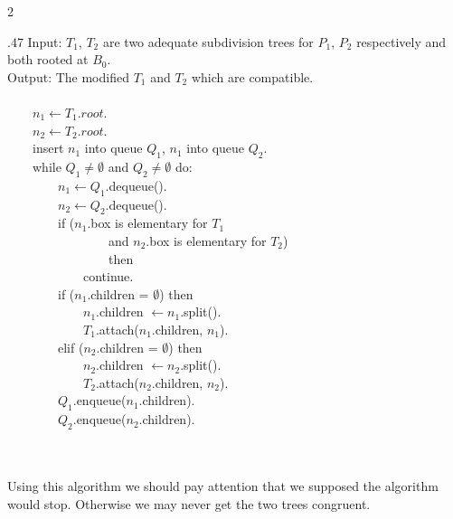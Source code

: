 \documentclass[twoside]{article}
\begin{document}
\begin{multicols}{2}
\begin{boxedminipage}{.47\textwidth}
Input: $T_1$, $T_2$ are two adequate subdivision trees for $P_1$, $P_2$ respectively and both rooted at $B_0$.
\\
Output: The modified $T_1$ and $T_2$ which are compatible.
\\
\\ \indent \ \ \ \ 
$n_1 \leftarrow T_1.root$.
\\ \indent \ \ \ \ 
$n_2 \leftarrow T_2.root$.
\\ \indent \ \ \ \ 
insert $n_1$ into queue $Q_1$, $n_1$ into queue $Q_2$.
\\ \indent \ \ \ \ 
while $Q_1 \neq \emptyset$ and $Q_2 \neq \emptyset$ do:
\\ \indent \ \ \ \ \ \ \ \ 
$n_1 \leftarrow Q_1$.dequeue().
\\ \indent \ \ \ \ \ \ \ \ 
$n_2 \leftarrow Q_2$.dequeue().
\\ \indent \ \ \ \ \ \ \ \ 
if ($n_1$.box is elementary for $T_1$
\\ \indent \ \ \ \ \ \ \ \ \ \ \ \ \ \ \ \ 
and $n_2$.box is elementary for $T_2$)
\\ \indent \ \ \ \ \ \ \ \ \ \ \ \ \ \ \ \ 
then
\\ \indent \ \ \ \ \ \ \ \ \ \ \ \ 
continue.
\\ \indent \ \ \ \ \ \ \ \ 
if ($n_1$.children = $\emptyset$) then
\\ \indent \ \ \ \ \ \ \ \ \ \ \ \ 
$n_1$.children $\leftarrow n_1$.split().
\\ \indent \ \ \ \ \ \ \ \ \ \ \ \ 
$T_1$.attach($n_1$.children, $n_1$).
\\ \indent \ \ \ \ \ \ \ \ 
elif ($n_2$.children = $\emptyset$) then
\\ \indent \ \ \ \ \ \ \ \ \ \ \ \ 
$n_2$.children $\leftarrow n_2$.split().
\\ \indent \ \ \ \ \ \ \ \ \ \ \ \ 
$T_2$.attach($n_2$.children, $n_2$).
\\ \indent \ \ \ \ \ \ \ \ 
$Q_1$.enqueue($n_1$.children).
\\ \indent \ \ \ \ \ \ \ \ 
$Q_2$.enqueue($n_2$.children).
\end{boxedminipage}
\\
\\
\indent
Using this algorithm we should pay attention that we supposed the algorithm would stop. Otherwise we may never get the two trees congruent.
\\
\newtheorem{lemma}{Lemma}

\end{multicols}
\end{document}
